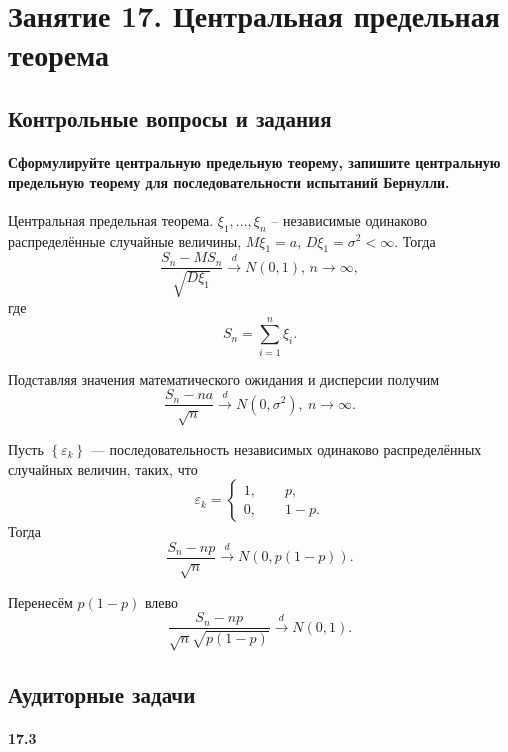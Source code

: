 \chapter*{Занятие 17. Центральная предельная теорема}

\section*{Контрольные вопросы и задания}

\subsubsection*{Сформулируйте центральную предельную теорему,
                запишите центральную предельную теорему для последовательности испытаний Бернулли.}

Центральная предельная теорема.
$ \xi_1, \dotsc, \xi_n$ -- независимые одинаково распределённые случайные величины,
$M \xi_1 = a, \,
  D \xi_1 = \sigma^2 < \infty $.
Тогда
$$ \frac{S_n - MS_n}{ \sqrt{D \xi_1}} \overset{d}{ \rightarrow } N \left( 0, 1 \right), \,
  n \to \infty,$$
где
$$S_n =
  \sum \limits_{i = 1}^n \xi_i.$$

Подставляя значения математического ожидания и дисперсии получим
$$ \frac{S_n - na}{ \sqrt{n}} \overset{d}{ \rightarrow } N \left( 0, \sigma^2 \right), \
  n \to \infty.$$

Пусть $ \left\{ \varepsilon_k \right\} $ ---
последовательность независимых одинаково распределённых случайных величин, таких, что
$$ \varepsilon_k =
  \begin{cases}
    1, \qquad p, \\
    0, \qquad 1 - p.
  \end{cases}$$
Тогда
$$ \frac{S_n - np}{ \sqrt{n}} \overset{d}{ \rightarrow }
  N \left( 0, p \left( 1 - p \right) \right).$$

Перенесём $p \left( 1 - p \right)$ влево
$$ \frac{S_n - np}{ \sqrt{n} \sqrt{p \left( 1 - p \right) }} \overset{d}{ \rightarrow }
  N \left( 0, 1 \right).$$

\section*{Аудиторные задачи}

\subsubsection*{17.3}

